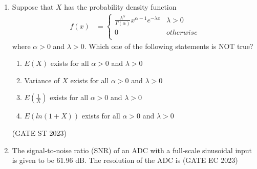 \begin{enumerate}[label=\thechapter.\arabic*,ref=\thechapter.\theenumi]
\item Suppose that $X$ has the probability density function
\begin{align}
f(x)&=
\begin{cases}
\frac{\lambda^{\alpha}}{\Gamma(\alpha)}x^{\alpha - 1} e^{-\lambda x} & \lambda > 0\\
0 & otherwise\\
\end{cases}
\end{align}
where $\alpha > 0$ and $\lambda > 0$. Which one of the following statements is NOT true?
\begin{enumerate}
\item $E(X)$ exists for all $\alpha > 0 $ and $ \lambda > 0$
\item Variance of $X$ exists for all $\alpha > 0$ and $\lambda > 0$
\item $E(\frac{1}{X})$ exists for all $\alpha > 0$ and $\lambda > 0$
\item $E(ln(1+X))$ exists for all $\alpha > 0$ and $\lambda > 0$
\end{enumerate}
\hfill (GATE ST 2023)\\

\item The signal-to-noise ratio (SNR) of an ADC with a full-scale sinusoidal input is given to be 61.96 dB.
The resolution of the ADC is 
\hfill (GATE EC 2023)

\end{enumerate}
